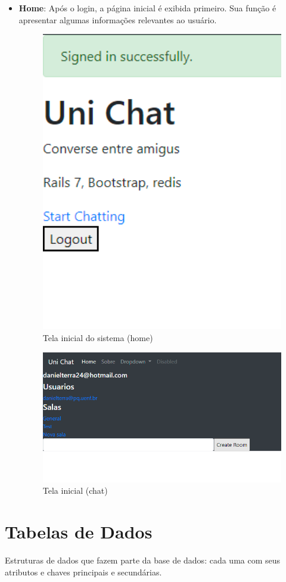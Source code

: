 \begin{itemize}
  \item \textbf{Home}: Após o login, a página inicial é exibida primeiro. Sua função é apresentar algumas informações relevantes ao usuário.
        \begin{figure}[H]
          \begin{center}
            \includegraphics[width=12cm]{Pictures/interface/logged.png}
            \caption{Tela inicial do sistema (home)} \label{recuperar}
          \end{center}
        \end{figure}


              \begin{figure}[H]
                \begin{center}
                  \includegraphics[width=12cm]{Pictures/interface/chat1.png}
                  \caption{Tela inicial (chat)} \label{chat1}
                \end{center}
              \end{figure}
      \end{itemize}


\section{Tabelas de Dados}
Estruturas de dados que fazem parte da base de dados: cada uma com seus atributos e chaves principais e secund\'{a}rias.
